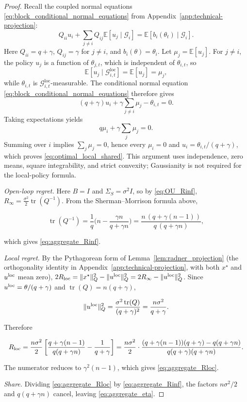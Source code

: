 \begin{proof}
Recall the coupled normal equations \eqref{eq:block_conditional_normal_equations}
from Appendix~\ref{app:technical-projection}:
\[
 Q_{ii}u_i+\sum_{j\ne i}Q_{ij}\mathbb E[u_j\mid\mathcal G_i]
 =\mathbb E[b_i(\theta_t)\mid\mathcal G_i].
\]
Here $Q_{ii}=q+\gamma$, $Q_{ij}=\gamma$ for $j\ne i$, and $b_i(\theta)=\theta_i$.
Let $\mu_j=\mathbb E[u_j]$. For $j\ne i$, the policy $u_j$ is a function of $\theta_{j,t}$,
which is independent of $\theta_{i,t}$, so
\[
\mathbb E[u_j\mid\mathcal G^{\mathrm{loc}}_{i,t}]
=\mathbb E[u_j]=\mu_j,
\]
while $\theta_{i,t}$ is
$\mathcal G^{\mathrm{loc}}_{i,t}$-measurable. The conditional normal equation
\eqref{eq:block_conditional_normal_equations} therefore gives
\[
(q+\gamma)u_i
+\gamma\sum_{j\ne i}\mu_j
-\theta_{i,t}=0.
\]
Taking expectations yields
\[
q\mu_i+\gamma\sum_j\mu_j=0.
\]
Summing over $i$ implies $\sum_j\mu_j=0$, hence every $\mu_i=0$ and
$u_i=\theta_{i,t}/(q+\gamma)$, which proves
\eqref{eq:optimal_local_shared}. This argument uses independence, zero means,
square integrability, and strict convexity; Gaussianity is not required for the
local-policy formula.

\emph{Open-loop regret.} Here $B=I$ and $\Sigma_S=\sigma^2I$, so by \eqref{eq:OU_Rinf}, $R_\infty=\tfrac{\sigma^2}2\operatorname{tr}(Q^{-1})$. From the Sherman--Morrison formula above,

\[
\operatorname{tr}(Q^{-1})=\frac1q\Big(n-\frac{\gamma n}{q+\gamma n}\Big)=\frac{n\,(q+\gamma(n-1))}{q\,(q+\gamma n)},
\]

which gives \eqref{eq:aggregate_Rinf}.

\emph{Local regret.} By the Pythagorean form of Lemma~\ref{lem:radner_projection} (the orthogonality identity in Appendix~\ref{app:technical-projection}, with both $x^\star$ and $u^{\rm loc}$ mean zero), $2R_{\rm loc}=\|x^\star\|_Q^2-\|u^{\rm loc}\|_Q^2=2R_\infty-\|u^{\rm loc}\|_Q^2$. Since $u^{\rm loc}=\theta/(q+\gamma)$ and $\operatorname{tr}(Q)=n(q+\gamma)$,

\[
\|u^{\rm loc}\|_Q^2=\frac{\sigma^2\operatorname{tr}(Q)}{(q+\gamma)^2}=\frac{n\sigma^2}{q+\gamma}.
\]

Therefore

\[
R_{\rm loc}=\frac{n\sigma^2}{2}\left[\frac{q+\gamma(n-1)}{q(q+\gamma n)}-\frac{1}{q+\gamma}\right]=\frac{n\sigma^2}{2}\cdot\frac{(q+\gamma(n-1))(q+\gamma)-q(q+\gamma n)}{q(q+\gamma)(q+\gamma n)} .
\]

The numerator reduces to $\gamma^2(n-1)$, which gives \eqref{eq:aggregate_Rloc}.

\emph{Share.} Dividing \eqref{eq:aggregate_Rloc} by \eqref{eq:aggregate_Rinf}, the factors $n\sigma^2/2$ and $q(q+\gamma n)$ cancel, leaving \eqref{eq:aggregate_eta}.

\end{proof}

